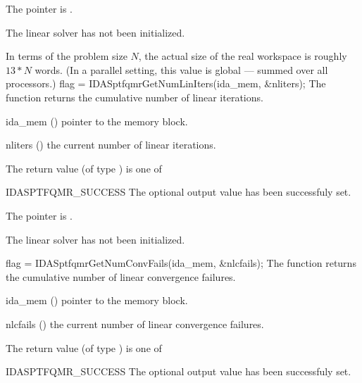 {{\begin{args}
    The  pointer is .
  \item[\Id{IDASPTFQMR\_LMEM\_NULL}]
    The {\idasptfqmr} linear solver has not been initialized.
  \end{args}
}
{
  In terms of the problem size $N$, the actual size of the real workspace is
  roughly $13*N$  words.  (In a parallel setting, this value
  is global --- summed over all processors.)
}
{
  flag = IDASptfqmrGetNumLinIters(ida\_mem, \&nliters);
}
{
  The function  returns the
  cumulative number of linear iterations.
}
{
  \begin{args}[nliters]
  \item[ida\_mem] ()
    pointer to the {\ida} memory block.
  \item[nliters] ()
    the current number of linear iterations.
  \end{args}
}
{
  The return value  (of type ) is one of
  \begin{args}
  \item[IDASPTFQMR\_SUCCESS] 
    The optional output value has been successfuly set.
  \item[\Id{IDASPTFQMR\_MEM\_NULL}]
    The  pointer is .
  \item[\Id{IDASPTFQMR\_LMEM\_NULL}]
    The {\idasptfqmr} linear solver has not been initialized.
  \end{args}
}
{}
{
  flag = IDASptfqmrGetNumConvFails(ida\_mem, \&nlcfails);
}
{
  The function  returns the
  cumulative number of linear convergence failures.
}
{
  \begin{args}[nlcfails]
  \item[ida\_mem] ()
    pointer to the {\ida} memory block.
  \item[nlcfails] ()
    the current number of linear convergence failures.
  \end{args}
}
{
  The return value  (of type ) is one of
  \begin{args}
  \item[IDASPTFQMR\_SUCCESS] 
    The optional output value has been successfuly set.
  \item[\Id{IDASPTFQMR\_MEM\_NULL}]

\end{args}}}
